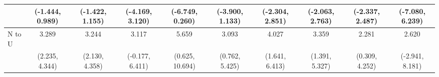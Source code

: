 {\begin{tabular}{l|c|c|c|c|c|c|c|c|c}
& {\scriptsize (-1.444, 0.989)}
& {\scriptsize (-1.422, 1.155)}
& {\scriptsize (-4.169, 3.120)}
& {\scriptsize (-6.749, 0.260)}
& {\scriptsize (-3.900, 1.133)}
& {\scriptsize (-2.304, 2.851)}
& {\scriptsize (-2.063, 2.763)}
& {\scriptsize (-2.337, 2.487)}
& {\scriptsize (-7.080, 6.239)}
\\ [0.1cm]
\hline
N to U
& 3.289 & 3.244 & 3.117 & 5.659 & 3.093 & 4.027 & 3.359 & 2.281 & 2.620 \\
& {\scriptsize (2.235, 4.344)}
& {\scriptsize (2.130, 4.358)}
& {\scriptsize (-0.177, 6.411)}
& {\scriptsize (0.625, 10.694)}
& {\scriptsize (0.762, 5.425)}
& {\scriptsize (1.641, 6.413)}
& {\scriptsize (1.391, 5.327)}
& {\scriptsize (0.309, 4.252)}
& {\scriptsize (-2.941, 8.181)}
\\ [0.1cm]
\hline
\hline
\end{tabular}
}
